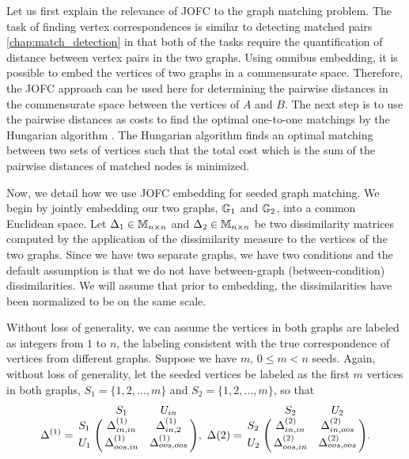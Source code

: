 \documentclass[12pt,oneside,final]{thesis}
\begin{document}
Let us first explain the relevance of JOFC to the graph matching problem. The  task of finding vertex correspondences is similar to  detecting matched pairs \ref{chap:match_detection} in that both of the tasks require the quantification of distance between vertex pairs  in the two graphs.
Using omnibus  embedding, it is possible to embed the vertices of two graphs in a commensurate space.
Therefore, the JOFC approach can be used here for determining the pairwise distances in the commensurate space between  the vertices of $A$ and $B$.
The next step is to use the pairwise distances as costs to find the optimal one-to-one matchings by the Hungarian algorithm \cite{Hung-algo}. The Hungarian algorithm finds an optimal matching between two sets of vertices such that the total  cost which is the sum of the pairwise distances of matched nodes is minimized.

Now, we detail how we use JOFC embedding for seeded graph matching. We begin by jointly embedding our two graphs, $\mathbb{G}_1$ and $\mathbb{G}_2$, into a common Euclidean space. Let $\Delta_1\in \mathbb{M}_{n \times n}$ and $\Delta_2\in \mathbb{M}_{n \times n}$ be two dissimilarity matrices computed by the application of the dissimilarity measure to the vertices of the two graphs. Since we have two separate graphs, we have two conditions and the default assumption is that we do not have  between-graph (between-condition) dissimilarities. We will assume that prior to embedding, the dissimilarities have been normalized to be on the same scale.

Without loss of generality, we can assume the vertices in both graphs are labeled as integers  from $1$ to $n$, the labeling consistent with the true correspondence  of vertices from different graphs. Suppose we have $m,\, 0 \leq m <n$ seeds. Again, without loss of generality, let the seeded vertices be labeled  as the first $m$ vertices in both graphs, $S_1=\{1,2,\ldots,m\}$ and $S_2=\{1,2,\ldots,m\}$, so that 
$$\Delta^{(1)}=\bordermatrix{&S_{1}&U_{in}\cr
                S_1&\gD^{(1)}_{{in},{in}} 
                & \gD^{(1)}_{{in},2}  \cr
                U_1& \gD^{(1)}_{{oos},{in}}  
                &  \gD^{(1)}_{{oos},{oos}}},\,\,
                \Delta{(2)}=\bordermatrix{&S_2&U_2\cr
                S_2&\gD^{(2)}_{{in},{in}} 
                & \gD^{(2)}_{{in},{oos}}  \cr
                U_2& \gD^{(2)}_{{oos},{in}}  
                &  \gD^{(2)}_{{oos},{oos}}}.$$
\end{document}
